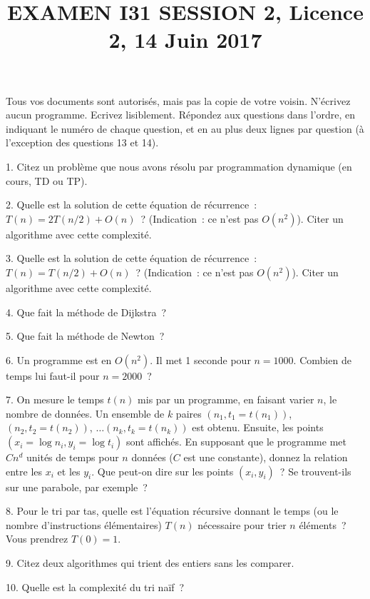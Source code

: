 \documentclass[11pt]{article}
\begin{document}
\title{EXAMEN I31 SESSION 2, Licence 2, 14 Juin 2017}
\date{}
\maketitle

Tous vos documents sont autorisés, mais pas la copie de votre voisin.
N’écrivez aucun programme. Ecrivez lisiblement. Répondez aux questions
dans l’ordre, en indiquant le numéro de chaque question, et en au plus deux lignes par question (à l'exception 
des questions 13 et 14).



{

1. Citez un problème que nous avons résolu par programmation dynamique (en cours, TD ou TP).
 
2. Quelle est la solution de cette équation de récurrence~: $T(n)=2 T(n/2) + O(n)$~? (Indication~: ce n'est pas $O(n^2)$). Citer un algorithme avec cette complexité. 
 
3. Quelle est la solution de cette équation de récurrence~: $T(n)=  T(n/2) + O(n
)$~? (Indication~: ce n'est pas $O(n^2)$). Citer un algorithme avec cette complexité. 
 
4. Que fait la méthode de Dijkstra~? 
 
5. Que fait la méthode de Newton~? 
 
6. Un programme est en $O(n^2)$. Il met 1 seconde pour $n=1000$. 
Combien de temps lui faut-il pour $n=2000$~?
 
7. On mesure le temps $t(n)$ mis par un programme, en faisant varier
$n$, le nombre de données. Un ensemble de $k$ paires $(n_1, t_1=t(n_1))$,
$(n_2, t_2=t(n_2))$, $\ldots (n_k, t_k=t(n_k))$ est obtenu.
Ensuite, les points $(x_i=\log n_i, y_i=\log t_i)$ sont affichés.
En supposant que le programme met $C n^d$ unités de temps pour $n$ données ($C$ est une constante), donnez la relation entre
les $x_i$ et les $y_i$.  Que peut-on dire sur les points $(x_i, y_i)$~?
Se trouvent-ils sur une parabole, par exemple~?
 
8. Pour le tri par tas, quelle est l'équation récursive
donnant le temps  (ou  le nombre d'instructions élémentaires) $T(n)$ nécessaire pour trier $n$ éléments~? Vous prendrez $T(0)=1$. 
 
9.  Citez deux algorithmes qui trient des entiers sans les comparer.
 
10.  Quelle est la complexité du tri naïf~?
 
}
\end{document}
